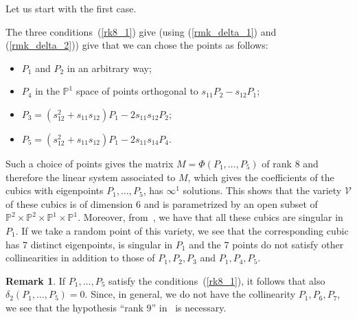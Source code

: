 \documentclass[11pt, a4paper, reqno, captions=tableheading,bibliography=totoc]{scrartcl}
\theoremstyle{plain}
\theoremstyle{definition}
\newtheorem{rmk}[lemma]{Remark}
\begin{document}
Let us start with the first case.

The three conditions~(\ref{rk8_1}) give (using (\ref{rmk_delta_1})
and (\ref{rmk_delta_2})) give that we can chose the points as follows:
\begin{itemize}
\item $P_1$ and $P_2$ in an arbitrary way;
\item $P_4$ in the $\mathbb{P}^1$
space of points orthogonal to $s_{11}P_2-s_{12}P_1$;
\item $P_3 = (s_{12}^2+s_{11}s_{12})P_1-2s_{11}s_{12}P_2$;
\item $P_5 = (s_{12}^2+s_{11}s_{12})P_1-2s_{11}s_{14}P_4$.
\end{itemize}

Such a choice
of points gives the matrix $M = \Phi(P_1, \dots, P_5)$ of rank $8$ and
therefore the linear system associated to $M$, which gives the
coefficients of the cubics with eigenpoints $P_1, \dots, P_5$, has $\infty^1$
solutions. This shows that the variety $\mathcal{V}$ of these cubics is
of dimension $6$ and is parametrized by an open subset of 
$\mathbb{P}^2 \times \mathbb{P}^2\times \mathbb{P}^1\times \mathbb{P}^1$.
Moreover, from~, we have that all these cubics
are singular in $P_1$.
If we take a random point of this variety, we see that the corresponding
cubic has $7$ distinct eigenpoints, is singular in $P_1$ and the $7$ points
do not satisfy other collinearities in addition to those of $P_1, P_2, P_3$
and $P_1, P_4, P_5$.

\begin{rmk} If $P_1, \dots, P_5$ satisfy the conditions~(\ref{rk8_1}),
it follows that also $\delta_2(P_1, \dots, P_5) = 0$. Since, 
in general, we do not have the collinearity $P_1, P_6, P_7$,
we see that the hypothesis ``rank $9$''
in~ is necessary.
\end{rmk}
\end{document}
